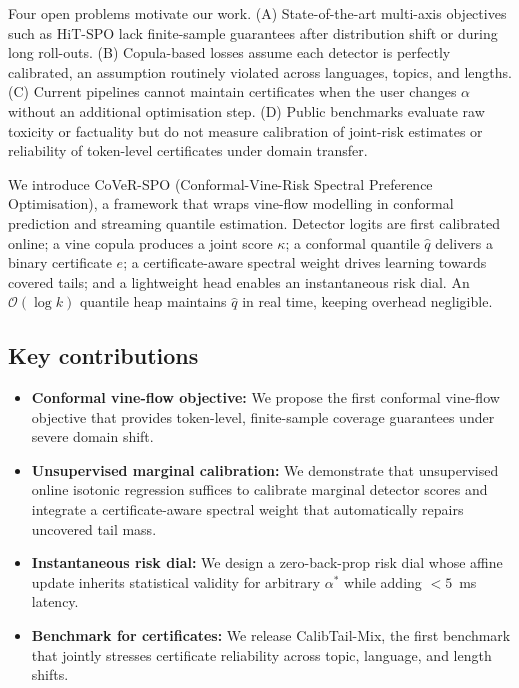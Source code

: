 \documentclass{article}
\begin{document}
Four open problems motivate our work. (A) State-of-the-art multi-axis objectives such as HiT-SPO lack finite-sample guarantees after distribution shift or during long roll-outs. (B) Copula-based losses assume each detector is perfectly calibrated, an assumption routinely violated across languages, topics, and lengths. (C) Current pipelines cannot maintain certificates when the user changes $\alpha$ without an additional optimisation step. (D) Public benchmarks evaluate raw toxicity or factuality but do not measure calibration of joint-risk estimates or reliability of token-level certificates under domain transfer.

We introduce CoVeR-SPO (Conformal-Vine-Risk Spectral Preference Optimisation), a framework that wraps vine-flow modelling in conformal prediction and streaming quantile estimation. Detector logits are first calibrated online; a vine copula produces a joint score $\kappa$; a conformal quantile $\hat q$ delivers a binary certificate $e$; a certificate-aware spectral weight drives learning towards covered tails; and a lightweight head enables an instantaneous risk dial. An $\mathcal{O}(\log k)$ quantile heap maintains $\hat q$ in real time, keeping overhead negligible.

\subsection{Key contributions}
\begin{itemize}
  \item \textbf{Conformal vine-flow objective:} We propose the first conformal vine-flow objective that provides token-level, finite-sample coverage guarantees under severe domain shift.
  \item \textbf{Unsupervised marginal calibration:} We demonstrate that unsupervised online isotonic regression suffices to calibrate marginal detector scores and integrate a certificate-aware spectral weight that automatically repairs uncovered tail mass.
  \item \textbf{Instantaneous risk dial:} We design a zero-back-prop risk dial whose affine update inherits statistical validity for arbitrary $\alpha^{*}$ while adding $<5$~ms latency.
  \item \textbf{Benchmark for certificates:} We release CalibTail-Mix, the first benchmark that jointly stresses certificate reliability across topic, language, and length shifts.
\end{itemize}
\end{document}
